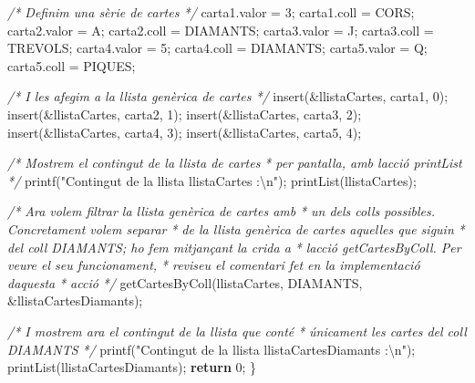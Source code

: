 \documentclass[]{book}
\newenvironment{Shaded}{\begin{snugshade}}{\end{snugshade}}
\newcommand{\CharTok}[1]{\textcolor[rgb]{0.31,0.60,0.02}{#1}}
\newcommand{\CommentTok}[1]{\textcolor[rgb]{0.56,0.35,0.01}{\textit{#1}}}
\newcommand{\ControlFlowTok}[1]{\textcolor[rgb]{0.13,0.29,0.53}{\textbf{#1}}}
\newcommand{\DecValTok}[1]{\textcolor[rgb]{0.00,0.00,0.81}{#1}}
\newcommand{\NormalTok}[1]{#1}
\newcommand{\SpecialCharTok}[1]{\textcolor[rgb]{0.00,0.00,0.00}{#1}}
\newcommand{\StringTok}[1]{\textcolor[rgb]{0.31,0.60,0.02}{#1}}
\begin{document}
\begin{Shaded}
\begin{Highlighting}[]
    \CommentTok{/* Definim una sèrie de cartes */}
\NormalTok{    carta1.valor = }\CharTok{\textquotesingle{}3\textquotesingle{}}\NormalTok{;}
\NormalTok{    carta1.coll = CORS;}
\NormalTok{    carta2.valor = }\CharTok{\textquotesingle{}A\textquotesingle{}}\NormalTok{;}
\NormalTok{    carta2.coll = DIAMANTS;}
\NormalTok{    carta3.valor = }\CharTok{\textquotesingle{}J\textquotesingle{}}\NormalTok{;}
\NormalTok{    carta3.coll = TREVOLS;}
\NormalTok{    carta4.valor = }\CharTok{\textquotesingle{}5\textquotesingle{}}\NormalTok{;}
\NormalTok{    carta4.coll = DIAMANTS;}
\NormalTok{    carta5.valor = }\CharTok{\textquotesingle{}Q\textquotesingle{}}\NormalTok{;}
\NormalTok{    carta5.coll = PIQUES;}

    \CommentTok{/* I les afegim a la llista genèrica de cartes */}
\NormalTok{    insert(\&llistaCartes, carta1, }\DecValTok{0}\NormalTok{);}
\NormalTok{    insert(\&llistaCartes, carta2, }\DecValTok{1}\NormalTok{);}
\NormalTok{    insert(\&llistaCartes, carta3, }\DecValTok{2}\NormalTok{);}
\NormalTok{    insert(\&llistaCartes, carta4, }\DecValTok{3}\NormalTok{);}
\NormalTok{    insert(\&llistaCartes, carta5, }\DecValTok{4}\NormalTok{);}

    \CommentTok{/* Mostrem el contingut de la llista de cartes}
\CommentTok{     * per pantalla, amb l\textquotesingle{}acció printList }
\CommentTok{     */}
\NormalTok{    printf(}\StringTok{"Contingut de la llista \textquotesingle{}llistaCartes\textquotesingle{} :}\SpecialCharTok{\textbackslash{}n}\StringTok{"}\NormalTok{);}
\NormalTok{    printList(llistaCartes);}

    \CommentTok{/* Ara volem filtrar la llista genèrica de cartes amb}
\CommentTok{     * un dels colls possibles. Concretament volem separar }
\CommentTok{     * de la llista genèrica de cartes aquelles que siguin }
\CommentTok{     * del coll DIAMANTS; ho fem mitjançant la crida a }
\CommentTok{     * l\textquotesingle{}acció getCartesByColl. Per veure el seu funcionament,}
\CommentTok{     * reviseu el comentari fet en la implementació d\textquotesingle{}aquesta}
\CommentTok{     * acció }
\CommentTok{     */}
\NormalTok{    getCartesByColl(llistaCartes, DIAMANTS, \&llistaCartesDiamants);}

    \CommentTok{/* I mostrem ara el contingut de la llista que conté}
\CommentTok{     * únicament les cartes del coll DIAMANTS }
\CommentTok{     */}
\NormalTok{    printf(}\StringTok{"Contingut de la llista \textquotesingle{}llistaCartesDiamants\textquotesingle{} :}\SpecialCharTok{\textbackslash{}n}\StringTok{"}\NormalTok{);}
\NormalTok{    printList(llistaCartesDiamants);}
    \ControlFlowTok{return} \DecValTok{0}\NormalTok{;}
\NormalTok{\}}


\end{Highlighting}
\end{Shaded}
\end{document}
